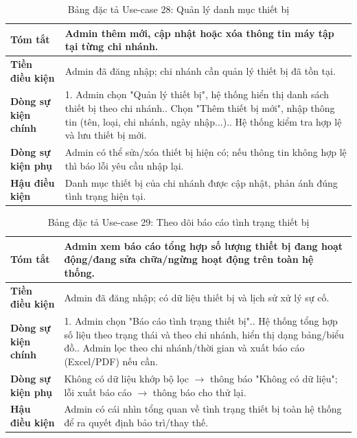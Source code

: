 \documentclass[a4paper,12pt]{article}
\begin{document}
\begin{table}[H]\centering\footnotesize
\begin{tabularx}{\textwidth}{|L{3.2cm}|Y|}
\hline \textbf{Tóm tắt} & Admin thêm mới, cập nhật hoặc xóa thông tin máy tập tại từng chi nhánh. \\ \hline
\textbf{Tiền điều kiện} & Admin đã đăng nhập; chi nhánh cần quản lý thiết bị đã tồn tại. \\ \hline
\textbf{Dòng sự kiện chính} & 1. Admin chọn "Quản lý thiết bị", hệ thống hiển thị danh sách thiết bị theo chi nhánh.. Chọn "Thêm thiết bị mới", nhập thông tin (tên, loại, chi nhánh, ngày nhập...).. Hệ thống kiểm tra hợp lệ và lưu thiết bị mới. \\ \hline
\textbf{Dòng sự kiện phụ} & Admin có thể sửa/xóa thiết bị hiện có; nếu thông tin không hợp lệ thì báo lỗi yêu cầu nhập lại. \\ \hline
\textbf{Hậu điều kiện} & Danh mục thiết bị của chi nhánh được cập nhật, phản ánh đúng tình trạng hiện tại. \\ \hline
\end{tabularx}
\caption{Bảng đặc tả Use-case 28: Quản lý danh mục thiết bị}
\end{table}

\begin{table}[H]\centering\footnotesize
\begin{tabularx}{\textwidth}{|L{3.2cm}|Y|}
\hline \textbf{Tóm tắt} & Admin xem báo cáo tổng hợp số lượng thiết bị đang hoạt động/đang sửa chữa/ngừng hoạt động trên toàn hệ thống. \\ \hline
\textbf{Tiền điều kiện} & Admin đã đăng nhập; có dữ liệu thiết bị và lịch sử xử lý sự cố. \\ \hline
\textbf{Dòng sự kiện chính} & 1. Admin chọn "Báo cáo tình trạng thiết bị".. Hệ thống tổng hợp số liệu theo trạng thái và theo chi nhánh, hiển thị dạng bảng/biểu đồ.. Admin lọc theo chi nhánh/thời gian và xuất báo cáo (Excel/PDF) nếu cần. \\ \hline
\textbf{Dòng sự kiện phụ} & Không có dữ liệu khớp bộ lọc $\rightarrow$ thông báo "Không có dữ liệu"; lỗi xuất báo cáo $\rightarrow$ thông báo cho thử lại. \\ \hline
\textbf{Hậu điều kiện} & Admin có cái nhìn tổng quan về tình trạng thiết bị toàn hệ thống để ra quyết định bảo trì/thay thế. \\ \hline
\end{tabularx}
\caption{Bảng đặc tả Use-case 29: Theo dõi báo cáo tình trạng thiết bị}
\end{table}
\end{document}
